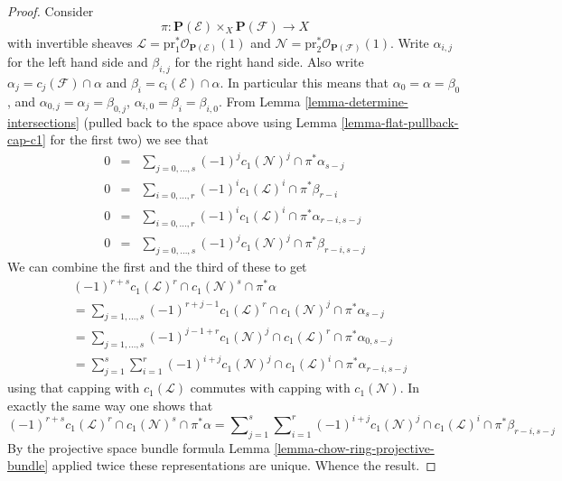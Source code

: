 \begin{proof}
Consider
$$
\pi : \mathbf{P}(\mathcal{E}) \times_X \mathbf{P}(\mathcal{F})
\longrightarrow
X
$$
with invertible sheaves
$\mathcal{L} = \text{pr}_1^*\mathcal{O}_{\mathbf{P}(\mathcal{E})}(1)$
and
$\mathcal{N} = \text{pr}_2^*\mathcal{O}_{\mathbf{P}(\mathcal{F})}(1)$.
Write $\alpha_{i, j}$ for the left hand side and $\beta_{i, j}$
for the right hand side.
Also write
$\alpha_j = c_j(\mathcal{F}) \cap \alpha$ and
$\beta_i = c_i(\mathcal{E}) \cap \alpha$.
In particular this means that $\alpha_0 = \alpha = \beta_0$,
and $\alpha_{0, j} = \alpha_j = \beta_{0, j}$,
$\alpha_{i, 0} = \beta_i = \beta_{i, 0}$.
From Lemma \ref{lemma-determine-intersections}
(pulled back to the space above using Lemma \ref{lemma-flat-pullback-cap-c1}
for the first two) we see that
\begin{eqnarray*}
0 & = &
\sum\nolimits_{j = 0, \ldots, s}
(-1)^j c_1(\mathcal{N})^j \cap \pi^*\alpha_{s - j}
\\
0 & = &
\sum\nolimits_{i = 0, \ldots, r}
(-1)^i c_1(\mathcal{L})^i \cap \pi^*\beta_{r - i}
\\
0 & = &
\sum\nolimits_{i = 0, \ldots, r}
(-1)^i
c_1(\mathcal{L})^i \cap \pi^*\alpha_{r - i, s - j}
\\
0 & = &
\sum\nolimits_{j = 0, \ldots, s}
(-1)^j
c_1(\mathcal{N})^j \cap \pi^*\beta_{r - i,  s - j}
\end{eqnarray*}
We can combine the first and the third of these to get
\begin{align*}
& (-1)^{r + s} c_1(\mathcal{L})^r \cap c_1(\mathcal{N})^s \cap \pi^*\alpha \\
& =
\sum\nolimits_{j = 1, \ldots, s}
(-1)^{r + j - 1}
c_1(\mathcal{L})^r \cap c_1(\mathcal{N})^j \cap \pi^*\alpha_{s - j}
\\
& =
\sum\nolimits_{j = 1, \ldots, s}
(-1)^{j - 1 + r} c_1(\mathcal{N})^j \cap
c_1(\mathcal{L})^r \cap \pi^*\alpha_{0, s - j}
\\
& =
\sum\nolimits_{j = 1}^s
\sum\nolimits_{i = 1}^r
(-1)^{i + j}
c_1(\mathcal{N})^j \cap c_1(\mathcal{L})^i \cap \pi^*\alpha_{r - i, s - j}
\end{align*}
using that capping with $c_1(\mathcal{L})$ commutes with
capping with $c_1(\mathcal{N})$. In exactly the same way one
shows that
$$
(-1)^{r + s} c_1(\mathcal{L})^r \cap c_1(\mathcal{N})^s \cap \pi^*\alpha
=
\sum\nolimits_{j = 1}^s
\sum\nolimits_{i = 1}^r
(-1)^{i + j}
c_1(\mathcal{N})^j \cap c_1(\mathcal{L})^i \cap \pi^*\beta_{r - i, s - j}
$$
By the projective space bundle formula
Lemma \ref{lemma-chow-ring-projective-bundle}
applied twice these representations
are unique. Whence the result.
\end{proof}









